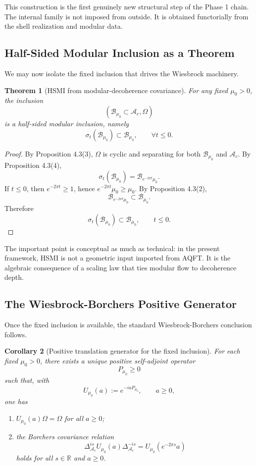 \documentclass[12pt]{article}
\newtheorem{theorem}{Theorem}[section]
\newtheorem{corollary}[theorem]{Corollary}
\theoremstyle{definition}
\theoremstyle{remark}
\newcommand{\tightlist}{%
  \setlength{\itemsep}{0pt}\setlength{\parskip}{0pt}}
\begin{document}
This construction is the first genuinely new structural step of the
Phase 1 chain. The internal family is not imposed from outside. It is
obtained functorially from the shell realization and modular data.

\subsection{Half-Sided Modular Inclusion as a
Theorem}\label{half-sided-modular-inclusion-as-a-theorem}

We may now isolate the fixed inclusion that drives the Wiesbrock
machinery.

\begin{theorem}[HSMI from modular-decoherence covariance]\label{thm:4.4}
For any fixed \(\mu_0>0\), the inclusion \[
(\mathcal{B}_{\mu_0}\subset \mathcal{A}_c,\Omega)
\] is a half-sided modular inclusion, namely \[
\sigma_t(\mathcal{B}_{\mu_0})\subset \mathcal{B}_{\mu_0},
\qquad
\forall t\le 0.
\]
\end{theorem}

\begin{proof}
By Proposition 4.3(3), \(\Omega\) is cyclic and separating for both
\(\mathcal{B}_{\mu_0}\) and \(\mathcal{A}_c\). By Proposition 4.3(4), \[
\sigma_t(\mathcal{B}_{\mu_0})
=
\mathcal{B}_{e^{-2\pi t}\mu_0}.
\] If \(t\le 0\), then \(e^{-2\pi t}\ge 1\), hence
\(e^{-2\pi t}\mu_0\ge \mu_0\). By Proposition 4.3(2), \[
\mathcal{B}_{e^{-2\pi t}\mu_0}\subset \mathcal{B}_{\mu_0}.
\] Therefore \[
\sigma_t(\mathcal{B}_{\mu_0})\subset \mathcal{B}_{\mu_0},
\qquad t\le 0.
\]
\end{proof}

The important point is conceptual as much as technical: in the present
framework, HSMI is not a geometric input imported from AQFT\@. It is the
algebraic consequence of a scaling law that ties modular flow to
decoherence depth.

\subsection{The Wiesbrock-Borchers Positive
Generator}\label{the-wiesbrock-borchers-positive-generator}

Once the fixed inclusion is available, the standard Wiesbrock-Borchers
conclusion follows.

\begin{corollary}[Positive translation generator for the fixed
inclusion]\label{cor:4.5}
For each fixed \(\mu_0>0\), there exists a unique positive self-adjoint
operator \[
P_{\mu_0}\ge 0
\] such that, with \[
U_{\mu_0}(a):=e^{-iaP_{\mu_0}},
\qquad
a\ge 0,
\] one has

\begin{enumerate}
\def\labelenumi{\arabic{enumi}.}
\tightlist
\item
  \(U_{\mu_0}(a)\Omega=\Omega\) for all \(a\ge 0\);
\item
  the Borchers covariance relation \[
  \Delta_{\mathcal{A}_c}^{is}U_{\mu_0}(a)\Delta_{\mathcal{A}_c}^{-is}
  =
  U_{\mu_0}(e^{-2\pi s}a)
  \] holds for all \(s\in\mathbb{R}\) and \(a\ge 0\).
\end{enumerate}
\end{corollary}
\end{document}

